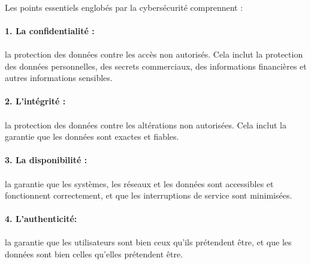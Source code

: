 \paragraph{ }
Les points essentiels englobés par la cybersécurité comprennent :
\space \paragraph{ }


\paragraph{1. La confidentialité :}\paragraph{} la protection des données contre les accès non autorisés. Cela inclut la protection des données personnelles, des secrets commerciaux, des informations financières et autres informations sensibles.

\paragraph{2. L'intégrité :}\paragraph{} la protection des données contre les altérations non autorisées. Cela inclut la garantie que les données sont exactes et fiables.

\paragraph{3. La disponibilité :} \paragraph{}la garantie que les systèmes, les réseaux et les données sont accessibles et fonctionnent correctement, et que les interruptions de service sont minimisées.

\paragraph{4. L'authenticité:}  \paragraph{}la garantie que les utilisateurs sont bien ceux qu'ils prétendent être, et que les données sont bien celles qu'elles prétendent être.

